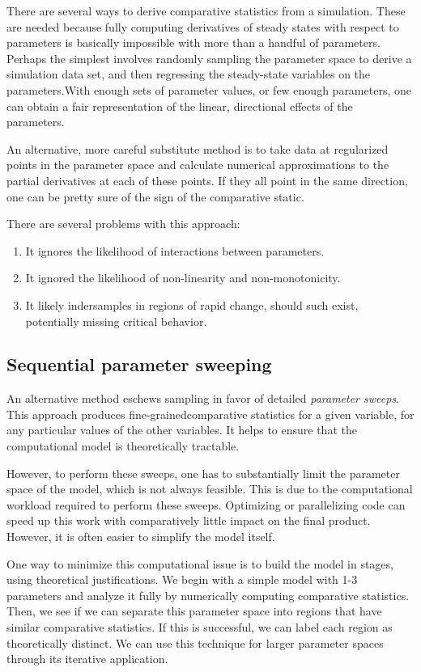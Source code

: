 \documentclass[titlepage, 12pt, leqno]{article}
\begin{document}
There are several ways to derive comparative statistics from a simulation. These 
are needed because fully computing derivatives of steady states with respect to
parameters is basically impossible with more than a handful of parameters.
Perhaps the simplest involves randomly sampling the parameter space to derive a 
simulation data set, and then regressing the steady-state variables on the
parameters.With enough sets of parameter values, or few enough parameters, one 
can obtain a fair representation of the linear, directional effects of the 
parameters. 

An alternative, more careful substitute method is to take data at
regularized points in the parameter space and calculate numerical
approximations to the partial derivatives at each of these points. If
they all point in the same direction, one can be pretty sure of the
sign of the comparative static.

There are several problems with this approach:
\begin{enumerate}[itemsep=-2pt]
    \item It ignores the likelihood of interactions between parameters.
    \item It ignored the likelihood of non-linearity and non-monotonicity.
    \item It likely indersamples in regions of rapid change, should such exist,
        potentially missing critical behavior.
\end{enumerate}

\subsection{Sequential parameter sweeping}

An alternative method eschews sampling in favor of detailed \textit{parameter
sweeps}. This approach produces fine-grainedcomparative statistics for a given
variable, for any particular values of the other variables. It helps to ensure
that the computational model is theoretically tractable.

However, to perform these sweeps, one has to substantially limit the parameter
space of the model, which is not always feasible. This is due to the
computational workload required to perform these sweeps. Optimizing or
parallelizing code can speed up this work with comparatively little impact on the
final product. However, it is often easier to simplify the model itself.

One way to minimize this computational issue is to build the model in stages,
using theoretical justifications. We begin with a simple model with 1-3 parameters
and analyze it fully by numerically computing comparative statistics. Then, we see
if we can separate this parameter space into regions that have similar comparative
statistics. If this is successful, we can label each region as theoretically
distinct. We can use this technique for larger parameter spaces through its
iterative application.
\end{document}

